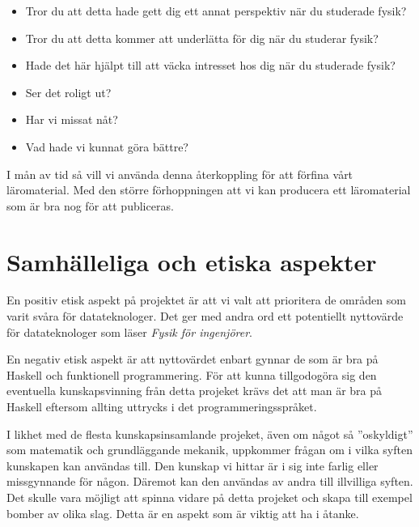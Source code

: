 \documentclass[12pt,a4paper]{article}
\begin{document}
\begin{itemize}
    \item Tror du att detta hade gett dig ett annat perspektiv när du studerade fysik?
    \item Tror du att detta kommer att underlätta för dig när du studerar fysik?
    \item Hade det här hjälpt till att väcka intresset hos dig när du studerade fysik?
    \item Ser det roligt ut?
    \item Har vi missat nåt?
    \item Vad hade vi kunnat göra bättre?
\end{itemize}

I mån av tid så vill vi använda denna återkoppling för att förfina vårt läromaterial. Med den större förhoppningen att vi kan producera ett läromaterial som är bra nog för att publiceras.

\section{Samhälleliga och etiska aspekter}

En positiv etisk aspekt på projektet är att vi valt att prioritera de områden som varit svåra för datateknologer. Det ger med andra ord ett potentiellt nyttovärde för datateknologer som läser \textit{Fysik för ingenjörer}.

En negativ etisk aspekt är att nyttovärdet enbart gynnar de som är bra på Haskell och funktionell programmering. För att kunna tillgodogöra sig den eventuella kunskapsvinning från detta projeket krävs det att man är bra på Haskell eftersom allting uttrycks i det programmeringsspråket.

I likhet med de flesta kunskapsinsamlande projeket, även om något så ''oskyldigt'' som matematik och grundläggande mekanik, uppkommer frågan om i vilka syften kunskapen kan användas till. Den kunskap vi hittar är i sig inte farlig eller missgynnande för någon. Däremot kan den användas av andra till illvilliga syften. Det skulle vara möjligt att spinna vidare på detta projeket och skapa till exempel bomber av olika slag. Detta är en aspekt som är viktig att ha i åtanke.
\end{document}
